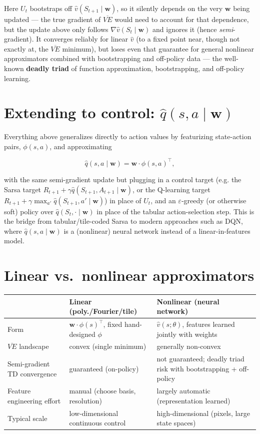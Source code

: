 \documentclass[11pt]{article}
\begin{document}
Here $U_t$ bootstraps off $\hat v(S_{t+1}\mid\mathbf{w})$, so it silently
depends on the very $\mathbf{w}$ being updated — the true gradient of
$\overline{VE}$ would need to account for that dependence, but the update
above only follows $\nabla \hat v(S_t\mid\mathbf{w})$ and ignores it
(hence \emph{semi}-gradient). It converges reliably for linear $\hat v$
(to a fixed point near, though not exactly at, the $\overline{VE}$
minimum), but loses even that guarantee for general nonlinear
approximators combined with bootstrapping and off-policy data — the
well-known \textbf{deadly triad} of function approximation, bootstrapping,
and off-policy learning.

\section{Extending to control: $\hat q(s,a\mid\mathbf{w})$}

Everything above generalizes directly to action values by featurizing
state-action pairs, $\phi(s,a)$, and approximating

\[
    \hat q(s,a \mid \mathbf{w}) = \mathbf{w} \cdot \phi(s,a)^{\top},
\]

with the same semi-gradient update but plugging in a control target (e.g.
the Sarsa target $R_{t+1} + \gamma \hat q(S_{t+1}, A_{t+1} \mid
\mathbf{w})$, or the Q-learning target $R_{t+1} + \gamma
\max_{a'}\hat q(S_{t+1}, a' \mid \mathbf{w})$) in place of $U_t$, and an
$\varepsilon$-greedy (or otherwise soft) policy over $\hat q(S_t, \cdot
\mid \mathbf{w})$ in place of the tabular action-selection step. This is
the bridge from tabular/tile-coded Sarsa to modern approaches such as DQN,
where $\hat q(s,a\mid\mathbf{w})$ is a (nonlinear) neural network instead
of a linear-in-features model.

\section{Linear vs.\ nonlinear approximators}

\begin{center}
\begin{tabular}{@{}p{3.6cm}p{5.8cm}p{5.8cm}@{}}
\toprule
 & Linear (poly./Fourier/tile) & Nonlinear (neural network) \\
\midrule
Form & $\mathbf{w}\cdot\phi(s)^{\top}$, fixed hand-designed $\phi$ & $\hat v(s;\theta)$, features learned jointly with weights \\
$\overline{VE}$ landscape & convex (single minimum) & generally non-convex \\
Semi-gradient TD convergence & guaranteed (on-policy) & not guaranteed; deadly triad risk with bootstrapping + off-policy \\
Feature engineering effort & manual (choose basis, resolution) & largely automatic (representation learned) \\
Typical scale & low-dimensional continuous control & high-dimensional (pixels, large state spaces) \\
\bottomrule
\end{tabular}
\end{center}
\end{document}

